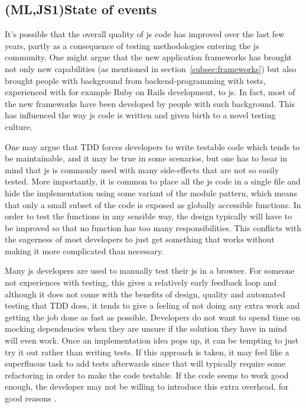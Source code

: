 \documentclass[11pt]{article}
\begin{document}
\subsection{(ML,JS1)State of events}
\label{subsec:stateofevents}

It's possible that the overall quality of \gls{js} code has improved over the last few years, partly as a consequence of testing methodologies entering the \gls{js} community. One might argue that the new application frameworks has brought not only new capabilities (as mentioned in section~\ref{subsec:frameworks}) but also brought people with background from backend-programming with tests, experienced with for example Ruby on Rails development, to \gls{js}. In fact, most of the new frameworks have been developed by people with such background. This has influenced the way \gls{js} code is written and given birth to a novel testing culture. \cite[questions~12-15]{Ahnve}

One may argue that TDD forces developers to write testable code which tends to be maintainable, and it may be true in some scenarios, but one has to bear in mind that \gls{js} is commonly used with many side-effects that are not so easily tested. More importantly, it is common to place all the \gls{js} code in a single file and hide the implementation using some variant of the module pattern\cite[p.~40]{GoodParts}, which means that only a small subset of the code is exposed as globally accessible functions. In order to test the functions in any sensible way, the design typically will have to be improved so that no function has too many responsibilities. This conflicts with the eagerness of most developers to just get something that works without making it more complicated than necessary.

Many \gls{js} developers are used to manually test their \gls{js} in a browser. For someone not experiences with testing, this gives a relatively early feedback loop and although it does not come with the benefits of design, quality and automated testing that TDD does, it tends to give a feeling of not doing any extra work and getting the job done as fast as possible. Developers do not want to spend time on mocking dependencies when they are unsure if the solution they have in mind will even work. Once an implementation idea pops up, it can be tempting to just try it out rather than writing tests. If this approach is taken, it may feel like a superfluous task to add tests afterwards since that will typically require some refactoring in order to make the code testable. If the code seems to work good enough, the developer may not be willing to introduce this extra overhead, for good reasons \cite[question~43]{Stenmark}.
\label{subsec:quality}
\end{document}
